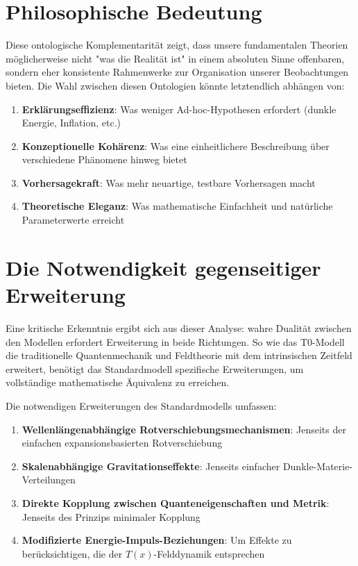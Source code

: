 \documentclass[12pt,a4paper]{article}
\newcommand{\Tfield}{T(x)}
\begin{document}
	\section{Philosophische Bedeutung}
	
	Diese ontologische Komplementarität zeigt, dass unsere fundamentalen Theorien möglicherweise nicht "was die Realität ist" in einem absoluten Sinne offenbaren, sondern eher konsistente Rahmenwerke zur Organisation unserer Beobachtungen bieten. Die Wahl zwischen diesen Ontologien könnte letztendlich abhängen von:
	
	\begin{enumerate}
		\item \textbf{Erklärungseffizienz}: Was weniger Ad-hoc-Hypothesen erfordert (dunkle Energie, Inflation, etc.)
		\item \textbf{Konzeptionelle Kohärenz}: Was eine einheitlichere Beschreibung über verschiedene Phänomene hinweg bietet
		\item \textbf{Vorhersagekraft}: Was mehr neuartige, testbare Vorhersagen macht
		\item \textbf{Theoretische Eleganz}: Was mathematische Einfachheit und natürliche Parameterwerte erreicht
	\end{enumerate}
	
	\section{Die Notwendigkeit gegenseitiger Erweiterung}
	
	Eine kritische Erkenntnis ergibt sich aus dieser Analyse: wahre Dualität zwischen den Modellen erfordert Erweiterung in beide Richtungen. So wie das T0-Modell die traditionelle Quantenmechanik und Feldtheorie mit dem intrinsischen Zeitfeld erweitert, benötigt das Standardmodell spezifische Erweiterungen, um vollständige mathematische Äquivalenz zu erreichen.
	
	Die notwendigen Erweiterungen des Standardmodells umfassen:
	
	\begin{enumerate}
		\item \textbf{Wellenlängenabhängige Rotverschiebungsmechanismen}: Jenseits der einfachen expansionsbasierten Rotverschiebung
		\item \textbf{Skalenabhängige Gravitationseffekte}: Jenseits einfacher Dunkle-Materie-Verteilungen
		\item \textbf{Direkte Kopplung zwischen Quanteneigenschaften und Metrik}: Jenseits des Prinzips minimaler Kopplung
		\item \textbf{Modifizierte Energie-Impuls-Beziehungen}: Um Effekte zu berücksichtigen, die der $\Tfield$-Felddynamik entsprechen
	\end{enumerate}
	
\end{document}
